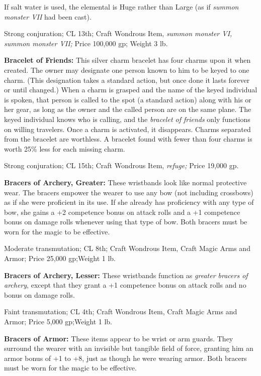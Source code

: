 \documentclass{article}
\begin{document}
If salt water is used, the elemental is Huge rather than Large (as if \textit{summon 
monster VII }had been cast).

Strong conjuration; CL 13th; Craft Wondrous Item, \textit{summon monster VI, summon 
monster VII; }Price 100,000 gp; Weight 3 lb.

\textbf{Bracelet of Friends:} This silver charm bracelet has four charms upon it 
when created. The owner may designate one person known to him to be keyed to one 
charm. (This designation takes a standard action, but once done it lasts forever 
or until changed.) When a charm is grasped and the name of the keyed individual 
is spoken, that person is called to the spot (a standard action) along with his 
or her gear, as long as the owner and the called person are on the same plane. 
The keyed individual knows who is calling, and the \textit{bracelet of friends 
}only functions on willing travelers. Once a charm is activated, it disappears. 
Charms separated from the bracelet are worthless. A bracelet found with fewer than 
four charms is worth 25\% less for each missing charm.

Strong conjuration; CL 15th; Craft Wondrous Item, \textit{refuge; }Price 19,000 
gp.

\textbf{Bracers of Archery, Greater:} These wristbands look like normal protective 
wear. The bracers empower the wearer to use any bow (not including crossbows) as 
if she were proficient in its use. If she already has proficiency with any type 
of bow, she gains a +2 competence bonus on attack rolls and a +1 competence bonus 
on damage rolls whenever using that type of bow. Both bracers must be worn for 
the magic to be effective.

Moderate transmutation; CL 8th; Craft Wondrous Item, Craft Magic Arms and Armor; 
Price 25,000 gp;Weight 1 lb.

\textbf{Bracers of Archery, Lesser:} These wristbands function as \textit{greater 
bracers of archery}, except that they grant a +1 competence bonus on attack rolls 
and no bonus on damage rolls.

Faint transmutation; CL 4th; Craft Wondrous Item, Craft Magic Arms and Armor; Price 
5,000 gp;Weight 1 lb.

\textbf{Bracers of Armor:} These items appear to be wrist or arm guards. They surround 
the wearer with an invisible but tangible field of force, granting him an armor 
bonus of +1 to +8, just as though he were wearing armor. Both bracers must be worn 
for the magic to be effective.
\end{document}
